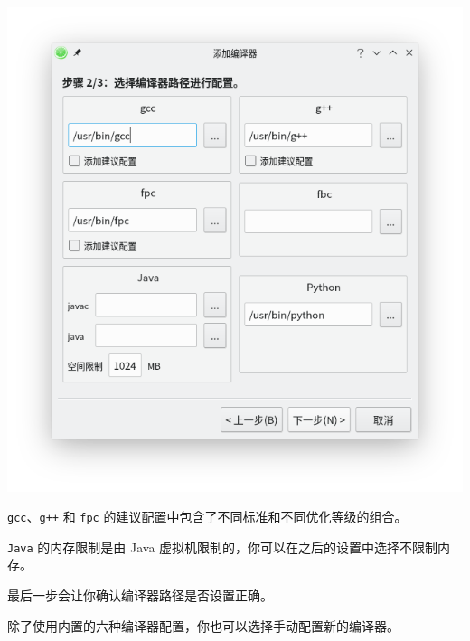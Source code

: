 \documentclass[UTF-8]{ctexart}
\begin{document}
				\begin{center}
					\includegraphics[scale=0.7]{pics/addcompiler.png}
				\end{center}

				\texttt{gcc}、\texttt{g++} 和 \texttt{fpc} 的建议配置中包含了不同标准和不同优化等级的组合。

				\texttt{Java} 的内存限制是由 Java 虚拟机限制的，你可以在之后的设置中选择不限制内存。

				最后一步会让你确认编译器路径是否设置正确。

				除了使用内置的六种编译器配置，你也可以选择手动配置新的编译器。
\end{document}
